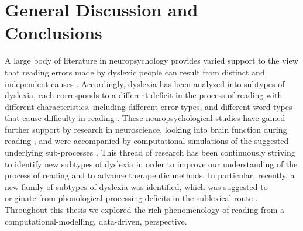 \chapter*{General Discussion and Conclusions}
A large body of literature in neuropsychology provides varied support to the view that reading errors made by dyslexic people can result from distinct and independent causes \citep{mn73, sw77, c83, shallice1988neuropsychology, c96, shallice2000selective, friedmann2001letter, ellis2013human}. Accordingly, dyslexia has been analyzed into subtypes of dyslexia, each corresponds to a different deficit in the process of reading with different characteristics, including different error types, and different word types that cause difficulty in reading \citep[for a review, see,  ][]{ck12}. These neuropsychological studies have gained further support by research in neuroscience, looking into brain function during reading \citep{fiebach2002fmri, joubert2004neural, levy2009testing}, and were accompanied by computational simulations of the suggested underlying sub-processes \citep{coltheart2001drc, perry2007nested}. This thread of research has been continuously striving to identify new subtypes of dyslexia in order to improve our understanding of the process of reading and to advance therapeutic methods. In particular, recently, a new family of subtypes of dyslexia was identified, which was suggested to originate from phonological-processing deficits in the sublexical route \citep{Gvion2010, Gvion2012}. Throughout this thesis we explored the rich phenomenology of reading from a computational-modelling, data-driven, perspective. 

